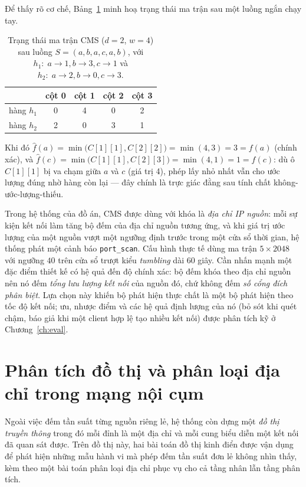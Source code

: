 Để thấy rõ cơ chế, Bảng~\ref{tab:cms-trace} minh hoạ trạng thái ma trận sau một
luồng ngắn chạy tay.

\begin{table}[H]
  \centering
  \caption{Trạng thái ma trận CMS ($d=2$, $w=4$) sau luồng $S=(a,b,a,c,a,b)$, với
           $h_1{:}\;a{\to}1, b{\to}3, c{\to}1$ và $h_2{:}\;a{\to}2, b{\to}0, c{\to}3$.}
  \label{tab:cms-trace}
  \small
  \begin{tabular}{@{}l cccc@{}}
    \toprule
    & cột 0 & cột 1 & cột 2 & cột 3 \\
    \midrule
    hàng $h_1$ & 0 & 4 & 0 & 2 \\
    hàng $h_2$ & 2 & 0 & 3 & 1 \\
    \bottomrule
  \end{tabular}
\end{table}

\noindent Khi đó $\hat f(a)=\min\big(C[1][1], C[2][2]\big)=\min(4,3)=3=f(a)$ (chính
xác), và $\hat f(c)=\min\big(C[1][1], C[2][3]\big)=\min(4,1)=1=f(c)$: dù ô $C[1][1]$
bị va chạm giữa $a$ và $c$ (giá trị 4), phép lấy nhỏ nhất vẫn cho ước lượng đúng nhờ
hàng còn lại --- đây chính là trực giác đằng sau tính chất không-ước-lượng-thiếu.

Trong hệ thống của đồ án, CMS được dùng với khóa là \emph{địa chỉ IP nguồn}: mỗi sự
kiện kết nối làm tăng bộ đếm của địa chỉ nguồn tương ứng, và khi giá trị ước lượng
của một nguồn vượt một ngưỡng định trước trong một cửa sổ thời gian, hệ thống phát
một cảnh báo \texttt{port\_scan}. Cấu hình thực tế dùng ma trận $5 \times 2048$ với
ngưỡng $40$ trên cửa sổ trượt kiểu \textit{tumbling} dài $60$ giây. Cần nhấn mạnh
một đặc điểm thiết kế có hệ quả đến độ chính xác: bộ đếm khóa theo địa chỉ nguồn nên
nó đếm \emph{tổng lưu lượng kết nối} của nguồn đó, chứ không đếm \emph{số cổng đích
phân biệt}. Lựa chọn này khiến bộ phát hiện thực chất là một bộ phát hiện theo tốc
độ kết nối; ưu, nhược điểm và các hệ quả định lượng của nó (bỏ sót khi quét chậm,
báo giả khi một client hợp lệ tạo nhiều kết nối) được phân tích kỹ ở
Chương~\ref{ch:eval}.

\section{Phân tích đồ thị và phân loại địa chỉ trong mạng nội cụm}
\label{sec:graph-ip}
\label{ch:other-dsa}

Ngoài việc đếm tần suất từng nguồn riêng lẻ, hệ thống còn dựng một \emph{đồ thị
truyền thông} trong đó mỗi đỉnh là một địa chỉ và mỗi cung biểu diễn một kết nối đã
quan sát được. Trên đồ thị này, hai bài toán đồ thị kinh điển được vận dụng để phát
hiện những mẫu hành vi mà phép đếm tần suất đơn lẻ không nhìn thấy, kèm theo một bài
toán phân loại địa chỉ phục vụ cho cả tầng nhân lẫn tầng phân tích.

